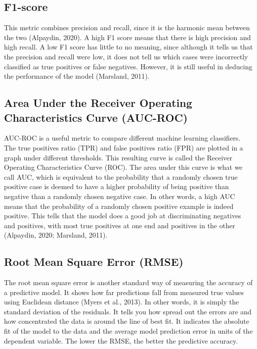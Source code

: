 \documentclass[
  man]{apa7}
\begin{document}
\subsection{F1-score}\label{f1-score}

This metric combines precision and recall, since it is the harmonic mean between the two (Alpaydin, 2020).
A high F1 score means that there is high precision and high recall.
A low F1 score has little to no meaning, since although it tells us that the precision and recall were low, it does not tell us which cases were incorrectly classified as true positives or false negatives.
However, it is still useful in deducing the performance of the model (Marsland, 2011).

\subsection{Area Under the Receiver Operating Characteristics Curve (AUC-ROC)}\label{area-under-the-receiver-operating-characteristics-curve-auc-roc}

AUC-ROC is a useful metric to compare different machine learning classifiers.
The true positives ratio (TPR) and false positives ratio (FPR) are plotted in a graph under different thresholds.
This resulting curve is called the Receiver Operating Characteristics Curve (ROC).
The area under this curve is what we call AUC, which is equivalent to the probability that a randomly chosen true positive case is deemed to have a higher probability of being positive than negative than a randomly chosen negative case.
In other words, a high AUC means that the probability of a randomly chosen positive example is indeed positive.
This tells that the model does a good job at discriminating negatives and positives, with most true positives at one end and positives in the other (Alpaydin, 2020; Marsland, 2011).

\subsection{Root Mean Square Error (RMSE)}\label{root-mean-square-error-rmse}

The root mean square error is another standard way of measuring the accuracy of a predictive model.
It shows how far predictions fall from measured true values using Euclidean distance (Myers et al., 2013).
In other words, it is simply the standard deviation of the residuals.
It tells you how spread out the errors are and how concentrated the data is around the line of best fit.
It indicates the absolute fit of the model to the data and the average model prediction error in units of the dependent variable.
The lower the RMSE, the better the predictive accuracy.
\end{document}
